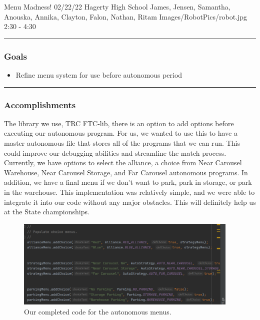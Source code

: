 \insertmeeting 
	{Menu Madness!} 
	{02/22/22} 
	{Hagerty High School}
	{James, Jensen, Samantha, Anouska, Annika, Clayton, Falon, Nathan, Ritam}
	{Images/RobotPics/robot.jpg}
	{2:30 - 4:30}
	
\noindent\hfil\rule{\textwidth}{.4pt}\hfil
\subsubsection*{Goals}
\begin{itemize}
    \item Refine menu system for use before autonomous period

\end{itemize} 

\noindent\hfil\rule{\textwidth}{.4pt}\hfil

\subsubsection*{Accomplishments}
The library we use, TRC FTC-lib, there is an option to add options before executing our autonomous program. For us, we wanted to use this to have a master autonomous file that stores all of the programs that we can run. This could improve our debugging abilities and streamline the match process. Currently, we have options to select the alliance, a choice from Near Carousel Warehouse, Near Carousel Storage, and Far Carousel autonomous programs. In addition, we have a final menu if we don't want to park, park in storage, or park in the warehouse. This implementation was relatively simple, and we were able to integrate it into our code without any major obstacles. This will definitely help us at the State championships. 

\begin{figure}[htp]
\centering
\includegraphics[width=0.95\textwidth, angle=0]{Meetings/February/02-22-22/02-22-22 1.png}
\caption{Our completed code for the autonomous menus.}
\label{fig:022222_1}
\end{figure}



